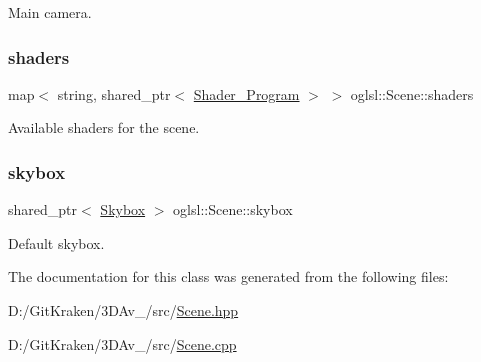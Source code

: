 Main camera. 

\mbox{\label{classoglsl_1_1_scene_ac60cfa73f999218a5c801308d29d33eb}} 
\subsubsection{\texorpdfstring{shaders}{shaders}}
{\footnotesize\ttfamily map$<$ string, shared\+\_\+ptr$<$ \mbox{\hyperlink{classoglsl_1_1_shader___program}{Shader\+\_\+\+Program}} $>$ $>$ oglsl\+::\+Scene\+::shaders\hspace{0.3cm}{\ttfamily [protected]}}



Available shaders for the scene. 

\mbox{\label{classoglsl_1_1_scene_af01c494a85900703fc19e5bb7c757ebc}} 
\subsubsection{\texorpdfstring{skybox}{skybox}}
{\footnotesize\ttfamily shared\+\_\+ptr$<$ \mbox{\hyperlink{classoglsl_1_1_skybox}{Skybox}} $>$ oglsl\+::\+Scene\+::skybox\hspace{0.3cm}{\ttfamily [protected]}}



Default skybox. 



The documentation for this class was generated from the following files\+:\begin{DoxyCompactItemize}
\item 
D\+:/\+Git\+Kraken/3\+D\+Av\+\_/src/\mbox{\hyperlink{_scene_8hpp}{Scene.\+hpp}}\item 
D\+:/\+Git\+Kraken/3\+D\+Av\+\_/src/\mbox{\hyperlink{_scene_8cpp}{Scene.\+cpp}}\end{DoxyCompactItemize}
